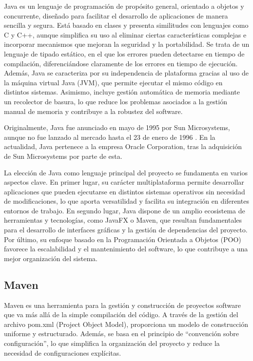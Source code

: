 \documentclass[../../main.tex]{subfiles}
\begin{document}
Java es un lenguaje de programación de propósito general, orientado a objetos y concurrente, diseñado para facilitar el desarrollo de aplicaciones de manera sencilla y segura. Está basado en clases y presenta similitudes con lenguajes como C y C++, aunque simplifica su uso al eliminar ciertas características complejas e incorporar mecanismos que mejoran la seguridad y la portabilidad. Se trata de un lenguaje de tipado estático, en el que los errores pueden detectarse en tiempo de compilación, diferenciándose claramente de los errores en tiempo de ejecución. Además, Java se caracteriza por su independencia de plataforma gracias al uso de la máquina virtual Java (JVM), que permite ejecutar el mismo código en distintos sistemas. Asimismo, incluye gestión automática de memoria mediante un recolector de basura, lo que reduce los problemas asociados a la gestión manual de memoria y contribuye a la robustez del software.\cite{gosling_java_lang_spec}

Originalmente, Java fue anunciado en mayo de 1995 por Sun Microsystems, aunque no fue lanzado al mercado hasta el 23 de enero de 1996 \cite{sun_microsystems_announcement}. En la actualidad, Java pertenece a la empresa Oracle Corporation, tras la adquisición de Sun Microsystems por parte de esta.

La elección de Java como lenguaje principal del proyecto se fundamenta en varios aspectos clave. En primer lugar, su carácter multiplataforma permite desarrollar aplicaciones que pueden ejecutarse en distintos sistemas operativos sin necesidad de modificaciones, lo que aporta versatilidad y facilita su integración en diferentes entornos de trabajo. En segundo lugar, Java dispone de un amplio ecosistema de herramientas y tecnologías, como JavaFX o Maven, que resultan fundamentales para el desarrollo de interfaces gráficas y la gestión de dependencias del proyecto. Por último, su enfoque basado en la Programación Orientada a Objetos (POO) favorece la escalabilidad y el mantenimiento del software, lo que contribuye a una mejor organización del sistema.

\clearpage

\subsection{Maven}

Maven es una herramienta para la gestión y construcción de proyectos software que va más allá de la simple compilación del código. A través de la gestión del archivo pom.xml (Project Object Model), proporciona un modelo de construcción uniforme y estructurado. Además, se basa en el principio de “convención sobre configuración”, lo que simplifica la organización del proyecto y reduce la necesidad de configuraciones explícitas.
\end{document}
